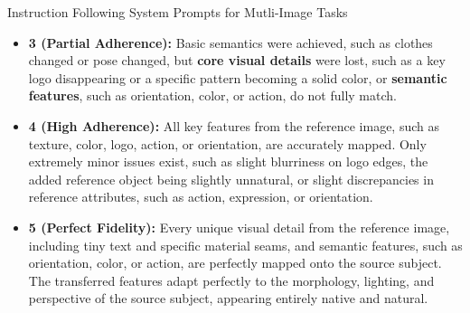 \begin{promptbox}[label={System Prompts: IF_Multi-Image}]{Instruction Following System Prompts for Mutli-Image Tasks}
\begin{itemize}[leftmargin=2.2em, labelsep=0.4em, itemsep=2pt]
    \item \textbf{3 (Partial Adherence):} Basic semantics were achieved, such as clothes changed or pose changed, but \textbf{core visual details} were lost, such as a key logo disappearing or a specific pattern becoming a solid color, or \textbf{semantic features}, such as orientation, color, or action, do not fully match.
    
    \item \textbf{4 (High Adherence):} All key features from the reference image, such as texture, color, logo, action, or orientation, are accurately mapped. Only extremely minor issues exist, such as slight blurriness on logo edges, the added reference object being slightly unnatural, or slight discrepancies in reference attributes, such as action, expression, or orientation.
    
    \item \textbf{5 (Perfect Fidelity):} Every unique visual detail from the reference image, including tiny text and specific material seams, and semantic features, such as orientation, color, or action, are perfectly mapped onto the source subject. The transferred features adapt perfectly to the morphology, lighting, and perspective of the source subject, appearing entirely native and natural.
\end{itemize}


\end{promptbox}
